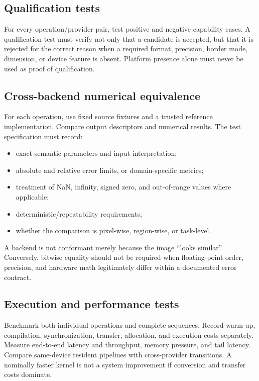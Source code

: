 \documentclass[11pt,a4paper,oneside]{article}
\begin{document}
\subsection{Qualification tests}

For every operation/provider pair, test positive and negative capability cases. A qualification test must verify not only that a candidate is accepted, but that it is rejected for the correct reason when a required format, precision, border mode, dimension, or device feature is absent. Platform presence alone must never be used as proof of qualification.

\subsection{Cross-backend numerical equivalence}

For each operation, use fixed source fixtures and a trusted reference implementation. Compare output descriptors and numerical results. The test specification must record:
\begin{itemize}
  \item exact semantic parameters and input interpretation;
  \item absolute and relative error limits, or domain-specific metrics;
  \item treatment of NaN, infinity, signed zero, and out-of-range values where applicable;
  \item deterministic/repeatability requirements;
  \item whether the comparison is pixel-wise, region-wise, or task-level.
\end{itemize}

A backend is not conformant merely because the image \textquotedblleft{}looks similar\textquotedblright{}. Conversely, bitwise equality should not be required when floating-point order, precision, and hardware math legitimately differ within a documented error contract.

\subsection{Execution and performance tests}

Benchmark both individual operations and complete sequences. Record warm-up, compilation, synchronization, transfer, allocation, and execution costs separately. Measure end-to-end latency and throughput, memory pressure, and tail latency. Compare same-device resident pipelines with cross-provider transitions. A nominally faster kernel is not a system improvement if conversion and transfer costs dominate.
\end{document}
